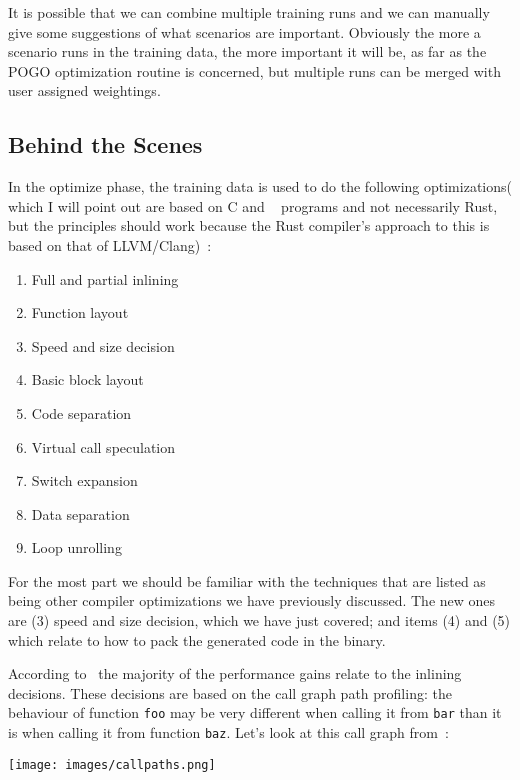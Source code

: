 It is possible that we can combine multiple training runs and we can manually give some suggestions of what scenarios are important. Obviously the more a scenario runs in the training data, the more important it will be, as far as the POGO optimization routine is concerned, but multiple runs can be merged with user assigned weightings.

\subsection*{Behind the Scenes}

In the optimize phase, the training data is used to do the following optimizations( which I will point out are based on C and \CPP~ programs and not necessarily Rust, but the principles should work because the Rust compiler's approach to this is based on that of LLVM/Clang)~\cite{pogo2}:

\begin{multicols}{2}
\begin{enumerate}
\item Full and partial inlining
\item Function layout
\item Speed and size decision
\item Basic block layout 
\item Code separation
\item Virtual call speculation
\item Switch expansion
\item Data separation
\item Loop unrolling
\end{enumerate}
\end{multicols}

For the most part we should be familiar with the techniques that are listed as being other compiler optimizations we have previously discussed. The new ones are (3) speed and size decision, which we have just covered; and items (4) and (5) which relate to how to pack the generated code in the binary.

According to~\cite{pogo2} the majority of the performance gains relate to the inlining decisions. These decisions are based on the call graph path profiling: the behaviour of function \texttt{foo} may be very different when calling it from \texttt{bar} than it is when calling it from function \texttt{baz}. Let's look at this call graph from~\cite{pogo2}:

\begin{center}
	\texttt{[image: images/callpaths.png]}
\end{center}

